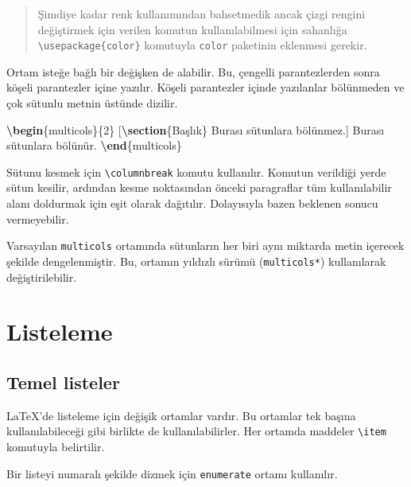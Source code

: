 \documentclass[
  10pt,
]{scrbook}
\newenvironment{Shaded}{\begin{snugshade}}{\end{snugshade}}
\newcommand{\ExtensionTok}[1]{#1}
\newcommand{\KeywordTok}[1]{\textcolor[rgb]{0.13,0.29,0.53}{\textbf{#1}}}
\newcommand{\NormalTok}[1]{#1}
\theoremstyle{definition}
\theoremstyle{definition}
\theoremstyle{definition}
\theoremstyle{definition}
\theoremstyle{remark}
\begin{document}
\begin{quote}
Şimdiye kadar renk kullanımından bahsetmedik ancak çizgi rengini değiştirmek için verilen komutun kullanılabilmesi için sahanlığa \texttt{\textbackslash{}usepackage\{color\}} komutuyla \texttt{color} paketinin eklenmesi gerekir.
\end{quote}

Ortam isteğe bağlı bir değişken de alabilir. Bu, çengelli parantezlerden sonra köşeli parantezler içine yazılır. Köşeli parantezler içinde yazılanlar bölünmeden ve çok sütunlu metnin üstünde dizilir.

\begin{Shaded}
\begin{Highlighting}[]
\KeywordTok{\textbackslash{}begin}\NormalTok{\{}\ExtensionTok{multicols}\NormalTok{\}\{2\}}
\NormalTok{ [}\KeywordTok{\textbackslash{}section}\NormalTok{\{Başlık\}}
\NormalTok{ Burası sütunlara bölünmez.]}
\NormalTok{ Burası sütunlara bölünür.}
\KeywordTok{\textbackslash{}end}\NormalTok{\{}\ExtensionTok{multicols}\NormalTok{\}}
\end{Highlighting}
\end{Shaded}

Sütunu kesmek için \texttt{\textbackslash{}columnbreak} komutu kullanılır. Komutun verildiği yerde sütun kesilir, ardından kesme noktasından önceki paragraflar tüm kullanılabilir alanı doldurmak için eşit olarak dağıtılır. Dolayısıyla bazen beklenen sonucu vermeyebilir.

Varsayılan \texttt{multicols} ortamında sütunların her biri aynı miktarda metin içerecek şekilde dengelenmiştir. Bu, ortamın yıldızlı sürümü (\texttt{multicols*}) kullanılarak değiştirilebilir.

\hypertarget{listeleme}{%
\section{Listeleme}\label{listeleme}}

\hypertarget{temel-listeler}{%
\subsection{Temel listeler}\label{temel-listeler}}

LaTeX'de listeleme için değişik ortamlar vardır. Bu ortamlar tek başına kullanılabileceği gibi birlikte de kullanılabilirler. Her ortamda maddeler \texttt{\textbackslash{}item} komutuyla belirtilir.

Bir listeyi numaralı şekilde dizmek için \texttt{enumerate} ortamı kullanılır.
\end{document}
